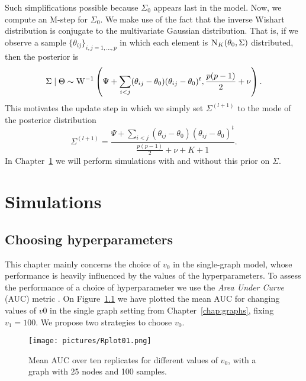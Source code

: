 \documentclass[a4paper, 11pt, oneside]{report}
\newcommand{\1}{\mathds{1}}
\newcommand{\inv}{^{-1}}
\newcommand{\Nor}{\textsc{N}}
\begin{document}
Such simplifications possible because $\Sigma_0$ appears last in the model.
Now, we compute an M-step for $\Sigma_0$.
We make use of the fact that the inverse Wishart distribution is conjugate to the multivariate Gaussian distribution.
That is, if we observe a sample $\{\theta_{ij}\}_{i,j=1,\dots,p}$ in which each element
is $\Nor_K (\theta_0, \Sigma)$ distributed, then the posterior is
\[\Sigma \mid \Theta \sim \textsc{W}\inv\left(\Psi + \sum_{i < j} (\theta_{ij} - \theta_0)(\theta_{ij} - \theta_0)^t , \frac{p(p-1)}{2} + \nu\right).\]
This motivates the update step in which we simply set $\Sigma^{(l+1)}$ to the mode of the posterior distribution
\[\Sigma^{(l+1)} = \frac{\Psi + \sum_{i < j} (\theta_{ij} - \theta_0)(\theta_{ij} - \theta_0)^t}{\frac{p(p-1)}{2} + \nu + K + 1}.\]
In Chapter~\ref{chap:simualtions} we will perform simulations with and without this prior on $\Sigma$.


\chapter{Simulations}\label{chap:simualtions}

\section{Choosing hyperparameters}\label{sec:hyperparameters}
This chapter mainly concerns the choice of $v_0$ in the single-graph model,
whose performance is heavily influenced by the values of the
hyperparameters.
To assess the performance of a choice of hyperparameter we use the \emph{Area Under Curve} (AUC) metric \citep{hastie2009elements}.
On Figure~\ref{fig:mean_auc} we have plotted the mean AUC for
changing values of $v0$ in the single graph setting from Chapter~\ref{chap:graphs}, fixing $v_1 = 100$.
We propose two strategies to choose $v_0$.
\begin{figure}[tb]
	\centering
	\texttt{[image: pictures/Rplot01.png]}
	\caption{Mean AUC over ten replicates for different values of $v_0$, with a
		graph with 25 nodes and 100 samples.}\label{fig:mean_auc}
\end{figure}
\end{document}
